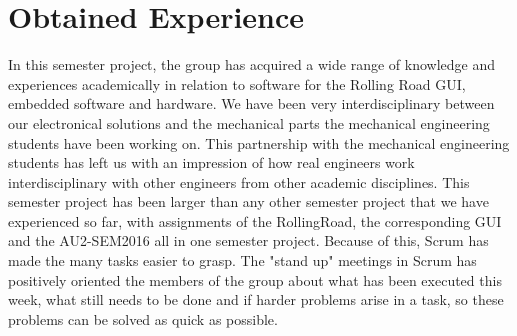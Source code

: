 \chapter{Obtained Experience}
In this semester project, the group has acquired a wide range of knowledge and experiences academically in relation to software for the Rolling Road GUI, embedded software and hardware. We have been very interdisciplinary between our electronical solutions and the mechanical parts the mechanical engineering students have been working on. This partnership with the mechanical engineering students has left us with an impression of how real engineers work interdisciplinary with other engineers from other academic disciplines. This semester project has been larger than any other semester project that we have experienced so far, with assignments of the RollingRoad, the corresponding GUI and the AU2-SEM2016 all in one semester project. Because of this, Scrum has made the many tasks easier to grasp. The "stand up" meetings in Scrum has positively oriented the members of the group about what has been executed this week, what still needs to be done and if harder problems arise in a task, so these problems can be solved as quick as possible.






